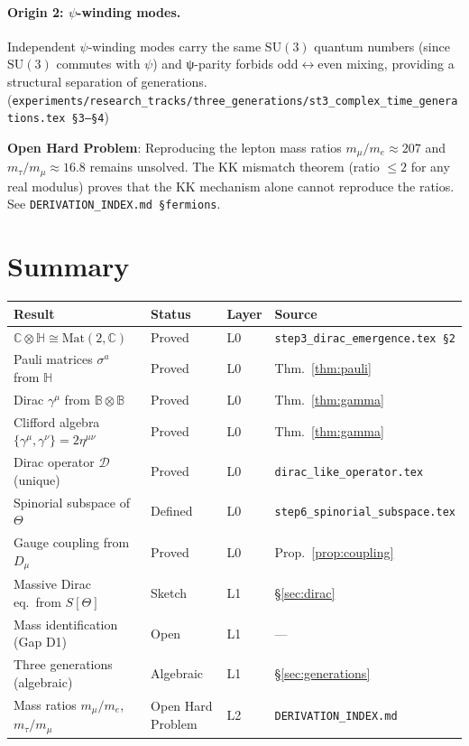 \documentclass[11pt,a4paper]{article}
\theoremstyle{definition}
\theoremstyle{remark}
\begin{document}
\paragraph{Origin 2: $\psi$-winding modes.}
Independent $\psi$-winding modes carry the same $\mathrm{SU}(3)$ quantum numbers
(since $\mathrm{SU}(3)$ commutes with $\psi$) and ψ-parity forbids
odd$\leftrightarrow$even mixing, providing a structural separation of generations.
(\texttt{experiments/research\_tracks/three\_generations/st3\_complex\_time\_generations.tex \S3--\S4})

\begin{tcolorbox}[colback=yellow!8!white,colframe=orange!60!black,title=Open: mass spectrum]
\textbf{Open Hard Problem}: Reproducing the lepton mass ratios
$m_\mu/m_e \approx 207$ and $m_\tau/m_\mu \approx 16.8$ remains unsolved.
The KK mismatch theorem (ratio $\leq 2$ for any real modulus) proves that the
KK mechanism alone cannot reproduce the ratios.
See \texttt{DERIVATION\_INDEX.md \S fermions}.
\end{tcolorbox}

\section{Summary}\label{sec:summary_fermions}

\begin{center}
\begin{longtable}{llll}
\toprule
Result & Status & Layer & Source \\
\midrule
$\mathbb{C}\otimes\mathbb{H} \cong \mathrm{Mat}(2,\mathbb{C})$ & Proved & L0 &
  \texttt{step3\_dirac\_emergence.tex \S2} \\
Pauli matrices $\sigma^a$ from $\mathbb{H}$ & Proved & L0 &
  Thm.~\ref{thm:pauli} \\
Dirac $\gamma^\mu$ from $\mathbb{B}\otimes\mathbb{B}$ & Proved & L0 &
  Thm.~\ref{thm:gamma} \\
Clifford algebra $\{\gamma^\mu,\gamma^\nu\}=2\eta^{\mu\nu}$ & Proved & L0 &
  Thm.~\ref{thm:gamma} \\
Dirac operator $\mathcal{D}$ (unique) & Proved & L0 &
  \texttt{dirac\_like\_operator.tex} \\
Spinorial subspace of $\Theta$ & Defined & L0 &
  \texttt{step6\_spinorial\_subspace.tex} \\
Gauge coupling from $D_\mu$ & Proved & L0 &
  Prop.~\ref{prop:coupling} \\
Massive Dirac eq.\ from $S[\Theta]$ & Sketch & L1 &
  \S\ref{sec:dirac} \\
Mass identification (Gap D1) & Open & L1 & — \\
Three generations (algebraic) & Algebraic & L1 &
  \S\ref{sec:generations} \\
Mass ratios $m_\mu/m_e$, $m_\tau/m_\mu$ & Open Hard Problem & L2 &
  \texttt{DERIVATION\_INDEX.md} \\
\bottomrule
\end{longtable}
\end{center}
\end{document}
